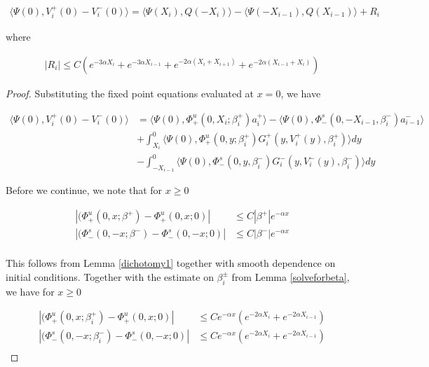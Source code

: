 \documentclass[thesis.tex]{subfiles}
\begin{document}
\begin{lemma}\label{jumplemma1}

\begin{align*}
\langle \Psi(0), V_i^+(0) - V_i^-(0) \rangle = 
\langle \Psi(X_i), Q(-X_i) \rangle - \langle \Psi(-X_{i-1}), Q(X_{i-1}) \rangle + R_i
\end{align*}

where 

\begin{align*}
|R_i| \leq C ( e^{-3 \alpha X_i} +  e^{-3 \alpha X_{i-1}}
+ e^{-2 \alpha (X_i + X_{i+1})} + e^{-2 \alpha (X_{i-1} + X_i)})
\end{align*}

\begin{proof}

Substituting the fixed point equations evaluated at $x = 0$, we have

\begin{align*}
\langle \Psi(0), V_i^+(0) - V_i^-(0) \rangle &= \langle \Psi(0), \Phi^u_+(0, X_i; \beta_i^+) a_i^+ \rangle
- \langle \Psi(0), \Phi^s_-(0, -X_{i-1}, \beta_i^-) a_{i-1}^- \rangle \\
&+ \int_{X_i}^0 \langle \Psi(0), \Phi_+^u(0, y; \beta_i^+) G_i^+(y, V_i^+(y),\beta_i^+) \rangle dy \\
&- \int_{-X_{i-1}}^0 \langle \Psi(0), \Phi_-^s(0, y, \beta_i^-) G_i^-(y, V_i^-(y),\beta_i^-) \rangle dy
\end{align*}

Before we continue, we note that for $x \geq 0$

\begin{align*}
|(\Phi_+^u(0, x; \beta^+) - \Phi_+^u(0, x; 0)| &\leq C |\beta^+| e^{-\alpha x} \\
|(\Phi_-^s(0, -x; \beta^-) - \Phi_-^s(0, -x; 0)| &\leq C |\beta^-| e^{-\alpha x} \\
\end{align*}

This follows from Lemma \ref{dichotomy1} together with smooth dependence on initial conditions. Together with the estimate on $\beta_i^\pm$ from Lemma \ref{solveforbeta}, we have for $x \geq 0$

\begin{align*}
|(\Phi_+^u(0, x; \beta_i^+) - \Phi_+^u(0, x; 0)| &\leq C e^{-\alpha x} (e^{-2 \alpha X_i} + e^{-2 \alpha X_{i-1}})\\
|(\Phi_-^s(0, -x; \beta_i^-) - \Phi_-^s(0, -x; 0)| &\leq C e^{-\alpha x} (e^{-2 \alpha X_i} + e^{-2 \alpha X_{i-1}}) \\
\end{align*}


\end{proof}
\end{lemma}
\end{document}

